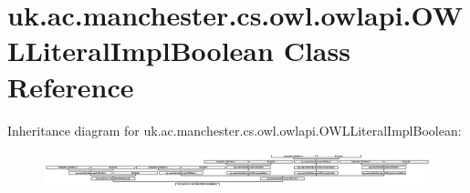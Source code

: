 \hypertarget{classuk_1_1ac_1_1manchester_1_1cs_1_1owl_1_1owlapi_1_1_o_w_l_literal_impl_boolean}{\section{uk.\-ac.\-manchester.\-cs.\-owl.\-owlapi.\-O\-W\-L\-Literal\-Impl\-Boolean Class Reference}
\label{classuk_1_1ac_1_1manchester_1_1cs_1_1owl_1_1owlapi_1_1_o_w_l_literal_impl_boolean}
}
Inheritance diagram for uk.\-ac.\-manchester.\-cs.\-owl.\-owlapi.\-O\-W\-L\-Literal\-Impl\-Boolean\-:\begin{figure}[H]
\begin{center}
\leavevmode
\includegraphics[height=1.028466cm]{classuk_1_1ac_1_1manchester_1_1cs_1_1owl_1_1owlapi_1_1_o_w_l_literal_impl_boolean}
\end{center}
\end{figure}
